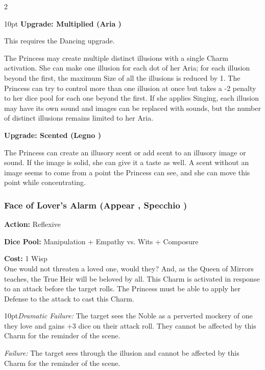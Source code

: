 \begin{multicols}{2}
\begin{myindentpar}{10pt}
\textbf{Upgrade: Multiplied (Aria \textbullet\textbullet)}

This requires the Dancing upgrade. 

The Princess may create multiple distinct illusions with a single Charm activation. She can make one illusion for each dot of her Aria; for each illusion beyond the first, the maximum Size of all the illusions is reduced by 1. The Princess can try to control more than one illusion at once but takes a -2 penalty to her dice pool for each one beyond the first. If she applies Singing, each illusion may have its own sound and images can be replaced with sounds, but the number of distinct illusions remains limited to her Aria.

\textbf{Upgrade: Scented (Legno \textbullet)}

The Princess can create an illusory scent or add scent to an illusory image or sound. If the image is solid, she can give it a taste as well. A scent without an image seems to come from a point the Princess can see, and she can move this point while concentrating.

\end{myindentpar}

\subsubsection*{Face of Lover's Alarm (Appear \textbullet\textbullet, Specchio \textbullet\textbullet)}

\noindent \textbf{Action:} Reflexive

\noindent \textbf{Dice Pool:} Manipulation + Empathy vs. Wits + Composure

\noindent \textbf{Cost:} 1 Wisp\\

\noindent One would not threaten a loved one, would they? And, as the Queen of Mirrors teaches, the True Heir will be beloved by all. This Charm is activated in response to an attack before the target rolls. The Princess must be able to apply her Defense to the attack to cast this Charm. 

\begin{myindentpar}{10pt}\emph{Dramatic Failure:} The target sees the Noble as a perverted mockery of one they love and gains +3 dice on their attack roll. They cannot be affected by this Charm for the reminder of the scene.

    \emph{Failure:} The target sees through the illusion and cannot be affected by this Charm for the reminder of the scene.


\end{myindentpar}
\end{multicols}
